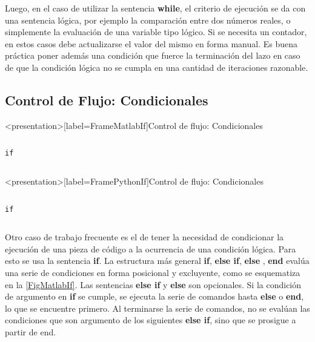 Luego, en el caso de utilizar la sentencia \textbf{while}, el criterio 
de ejecución se da con una sentencia lógica, por ejemplo la comparación
entre dos números reales, o simplemente la evaluación de una 
variable tipo lógico. Si se necesita un contador, en estos casos
debe actualizarse el valor del mismo en forma manual. Es buena
práctica poner además una condición que fuerce la terminación  
del lazo en caso de que la condición lógica no se cumpla 
en una cantidad de iteraciones razonable. 

\mode*

\subsection{Control de Flujo: Condicionales}

\begin{frame}<presentation>[label=FrameMatlabIf]{Control de flujo: Condicionales} 
\begin{columns}[T]
\hfill \large\texttt{if}

  



\end{columns}
\end{frame}

\begin{frame}<presentation>[label=FramePythonIf]{Control de flujo: Condicionales} 
\begin{columns}[T]
\hfill \large\texttt{if}

  

  

\end{columns}
\end{frame}


Otro caso de trabajo frecuente es el de tener 
la necesidad de condicionar la ejecución de 
una pieza de código a la ocurrencia de una 
condición lógica. Para esto se usa la sentencia
\textbf{if}. La estructura más general \textbf{if},
\textbf{else if}, \textbf{else} , \textbf{end} evalúa
una serie de condiciones en forma posicional  y 
excluyente, como se esquematiza en la 
\autoref{FigMatlabIf}. Las sentencias \textbf{else if} y 
\textbf{else} son opcionales. Si la condición 
de argumento en \textbf{if} se cumple, se ejecuta
la serie de comandos hasta \textbf{else} o 
\textbf{end}, lo que se encuentre primero. Al 
terminarse la serie de comandos, no se evalúan 
las condiciones que son argumento de los 
siguientes \textbf{else if}, sino que se
prosigue a partir de end. 

